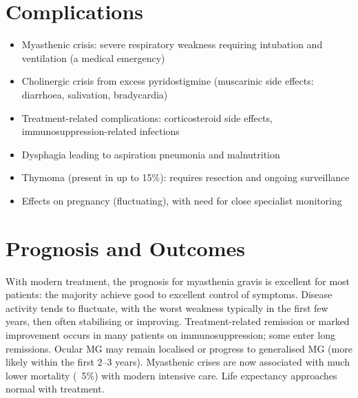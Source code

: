 \section*{Complications}
\begin{itemize}
    \item Myasthenic crisis: severe respiratory weakness requiring intubation and ventilation (a medical emergency)
    \item Cholinergic crisis from excess pyridostigmine (muscarinic side effects: diarrhoea, salivation, bradycardia)
    \item Treatment-related complications: corticosteroid side effects, immunosuppression-related infections
    \item Dysphagia leading to aspiration pneumonia and malnutrition
    \item Thymoma (present in up to 15\%): requires resection and ongoing surveillance
    \item Effects on pregnancy (fluctuating), with need for close specialist monitoring
\end{itemize}

\section*{Prognosis and Outcomes}
With modern treatment, the prognosis for myasthenia gravis is excellent for most patients: the majority achieve good to excellent control of symptoms. Disease activity tends to fluctuate, with the worst weakness typically in the first few years, then often stabilising or improving. Treatment-related remission or marked improvement occurs in many patients on immunosuppression; some enter long remissions. Ocular MG may remain localised or progress to generalised MG (more likely within the first 2--3 years). Myasthenic crises are now associated with much lower mortality (~5\%) with modern intensive care. Life expectancy approaches normal with treatment.

